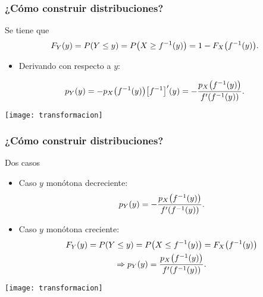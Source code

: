 \documentclass[table]{beamer}
\begin{document}
\begin{frame}
    \frametitle{¿Cómo construir distribuciones?}
    \begin{block}{Se tiene que}
        \begin{equation*}
            \pFF{Y}{y} = \prob{Y \leq y} = \prob{X \geq f^{-1} \parens{y}} = 1 - \pFF{X}{f^{-1} \parens{y}} .
        \end{equation*}
        \begin{itemize}
            \item Derivando con respecto a $y$:
        \end{itemize}
        \begin{equation*}
            \ppdf{Y}{y} = - \ppdf{X}{f^{-1} \parens{y}} \sparens{f^{-1}}' \parens{y}
            = - \frac{\ppdf{X}{f^{-1} \parens{y}}}{f' \parens{f^{-1} \parens{y}}} .
        \end{equation*}
    \end{block}
    \begin{center}
        \texttt{[image: transformacion]}
    \end{center}
\end{frame}

\begin{frame}
    \frametitle{¿Cómo construir distribuciones?}
    \begin{block}{Dos casos}
        \begin{itemize}
            \item Caso $y$ monótona decreciente:
                \begin{equation*}
                    \ppdf{Y}{y} = - \frac{\ppdf{X}{f^{-1} \parens{y}}}{f' \parens{f^{-1} \parens{y}}} .
                \end{equation*}
            \item Caso $y$ monótona creciente:
                \begin{multline*}
                    \pFF{Y}{y} = \prob{Y \leq y} = \prob{X \leq f^{-1} \parens{y}} = \pFF{X}{f^{-1} \parens{y}} \\
                    \Rightarrow
                    \ppdf{Y}{y} = \frac{\ppdf{X}{f^{-1} \parens{y}}}{f' \parens{f^{-1} \parens{y}}} .
                \end{multline*}
        \end{itemize}
    \end{block}
    \begin{center}
        \texttt{[image: transformacion]}
    \end{center}
\end{frame}
\end{document}
